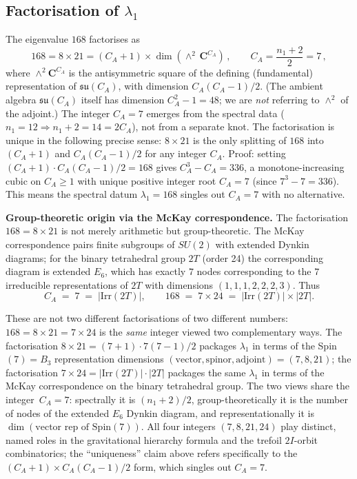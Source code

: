 \documentclass[11pt]{article}
\newcommand{\su}{\mathfrak{su}}
\newcommand{\CA}{C_A}
\begin{document}
\subsection{Factorisation of $\lambda_1$}

The eigenvalue $168$ factorises as
\begin{equation}
  168 = 8 \times 21 = (\CA + 1) \times
  \dim(\wedge^2\,\mathbf{C}^{\CA})\,,
  \qquad \CA = \frac{n_1 + 2}{2} = 7\,,
\end{equation}
where $\wedge^2 \mathbf{C}^{\CA}$ is the antisymmetric square of
the defining (fundamental) representation of $\su(\CA)$, with
dimension $\CA(\CA{-}1)/2$.  (The ambient algebra $\su(\CA)$
itself has dimension $\CA^2 - 1 = 48$; we are \emph{not}
referring to $\wedge^2$ of the adjoint.)
The integer $\CA = 7$ emerges from the spectral data
($n_1 = 12 \Rightarrow n_1 + 2 = 14 = 2\CA$), not from a
separate knot.  The factorisation is unique in the following
precise sense: $8 \times 21$ is the only splitting of $168$
into $(\CA{+}1)$ and $\CA(\CA{-}1)/2$ for any integer $\CA$.
Proof: setting $(\CA{+}1) \cdot \CA(\CA{-}1)/2 = 168$ gives
$\CA^3 - \CA = 336$, a monotone-increasing cubic on
$\CA \geq 1$ with unique positive integer root $\CA = 7$
(since $7^3 - 7 = 336$).  This means the spectral datum
$\lambda_1 = 168$ singles out $\CA = 7$ with no alternative.

\medskip
\noindent\textbf{Group-theoretic origin via the McKay correspondence.}
The factorisation $168 = 8 \times 21$ is not merely arithmetic but
group-theoretic.  The McKay correspondence pairs finite subgroups
of $SU(2)$ with extended Dynkin diagrams; for the binary tetrahedral
group $2T$ (order 24) the corresponding diagram is extended $E_6$,
which has exactly $7$ nodes corresponding to the $7$ irreducible
representations of $2T$ with dimensions $(1,1,1,2,2,2,3)$.  Thus
\begin{equation}
  \CA \;=\; 7 \;=\; |\mathrm{Irr}(2T)|,\qquad
  168 \;=\; 7 \times 24 \;=\; |\mathrm{Irr}(2T)| \times |2T|.
\end{equation}

These are not two different factorisations of two different
numbers: $168 = 8 \times 21 = 7 \times 24$ is the \emph{same}
integer viewed two complementary ways.  The factorisation
$8 \times 21 = (7{+}1) \cdot 7(7{-}1)/2$ packages $\lambda_1$ in
terms of the Spin$(7) = B_3$ representation dimensions
$(\text{vector}, \text{spinor}, \text{adjoint}) = (7, 8, 21)$; the
factorisation $7 \times 24 = |\mathrm{Irr}(2T)| \cdot |2T|$ packages
the same $\lambda_1$ in terms of the McKay correspondence on the
binary tetrahedral group.  The two views share the integer~$\CA = 7$:
spectrally it is $(n_1{+}2)/2$, group-theoretically it is the number
of nodes of the extended $E_6$ Dynkin diagram, and representationally
it is $\dim(\text{vector rep of } \mathrm{Spin}(7))$.  All four
integers $(7, 8, 21, 24)$ play distinct, named roles in the
gravitational hierarchy formula and the trefoil $2I$-orbit
combinatorics; the ``uniqueness'' claim above refers specifically
to the $(\CA{+}1) \times \CA(\CA{-}1)/2$ form, which singles out
$\CA = 7$.
\end{document}
